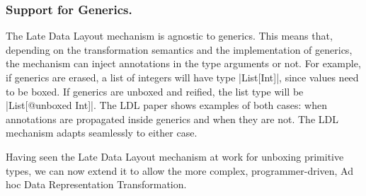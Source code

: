 \subsubsection{Support for Generics.} The Late Data Layout mechanism
is agnostic to generics. This means that, depending on the
transformation semantics and the implementation of generics, the
mechanism can inject annotations in the type arguments or not. For
example, if generics are erased, a list of integers will have type
|List[Int]|, since values need to be boxed. If generics are unboxed
and reified, the list type will be |List[@unboxed Int]|. The LDL
paper \cite{ldl} shows examples of both cases: when
annotations are propagated inside generics and when they are not. The
LDL mechanism adapts seamlessly to either case.

Having seen the Late Data Layout mechanism at work for unboxing primitive types, we can now extend it to allow the more complex, programmer-driven, Ad hoc Data Representation Transformation.

